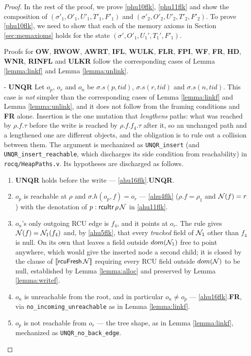 \begin{proof}
In the rest of the proof, we prove \ref{phu10flk}, \ref{phu11flk} and show the composition of $(\sigma'_1, O'_1, U'_1,T'_1,F'_1)$ and  $(\sigma'_2, O'_2, U'_2,T'_2,F'_2)$. To prove \ref{phu10flk}, we need to show that each of the memory axioms in Section \ref{sec:memaxioms} holds for the state $(\sigma',O'_1,U_1',T_1',F'_1)$.

Proofs for \textbf{OW}, \textbf{RWOW}, \textbf{AWRT}, \textbf{IFL}, \textbf{WULK}, \textbf{FLR}, \textbf{FPI}, \textbf{WF}, \textbf{FR}, \textbf{HD}, \textbf{WNR}, \textbf{RINFL} and \textbf{ULKR} follow the corresponding cases of Lemma \ref{lemma:linkf} and Lemma \ref{lemma:unlink}.

\begin{case} - \textbf{UNQR}
Let $o_p$, $o_r$ and $o_n$ be $\sigma.s(p,tid)$, $\sigma.s(r,tid)$ and
$\sigma.s(n,tid)$.  This case is \emph{not} simpler than the corresponding cases
of Lemma \ref{lemma:linkf} and Lemma \ref{lemma:unlink}, and it does not follow
from the framing conditions and \textbf{FR} alone.  Insertion is the one mutation
that \emph{lengthens} paths: what was reached by $\rho.f.\tau$ before the write is
reached by $\rho.f.f_4.\tau$ after it, so an unchanged path and a lengthened one
are different objects, and the obligation is to rule out a collision between them.
The argument is mechanized as \texttt{UNQR\_insert} (and
\texttt{UNQR\_insert\_reachable}, which discharges its side condition from
reachability) in \texttt{rocq/HeapPaths.v}.  Its hypotheses are discharged as
follows.

\begin{enumerate}
\item \textbf{UNQR} holds before the write --- \ref{ahu16flk}.\textbf{UNQR}.
\item $o_p$ is reachable at $\rho$ and $\sigma.h(o_p,f) = o_r$ --- \ref{ahu4flk}
  ($\rho.f = \rho_1$ and $\mathcal{N}(f) = r$) with the denotation of
  $p:\textsf{rcuItr}\,\rho\,\mathcal{N}$ in \ref{ahu11flk}.
\item $o_n$'s only outgoing \textsf{RCU} edge is $f_4$, and it points at $o_r$.
  The rule gives $\mathcal{N}(f) = \mathcal{N}_1(f_4)$ and, by \ref{ahu5flk}, that every
  \emph{tracked} field of $\mathcal{N}_1$ other than $f_4$ is \textsf{null}.  On its own
  that leaves a field outside $dom(\mathcal{N}_1)$ free to point anywhere, which would give
  the inserted node a second child; it is closed by the clause of
  $\llbracket \textsf{rcuFresh}\,\mathcal{N} \rrbracket$ requiring every \textsf{RCU} field
  outside $dom(\mathcal{N})$ to be \textsf{null}, established by Lemma \ref{lemma:alloc}
  and preserved by Lemma \ref{lemma:writef}.
\item $o_n$ is unreachable from the root, and in particular $o_n \neq o_p$ ---
  \ref{ahu16flk}.\textbf{FR}, via \texttt{no\_incoming\_unreachable} as in
  Lemma \ref{lemma:linkf}.
\item $o_p$ is not reachable from $o_r$ --- the tree shape, as in
  Lemma \ref{lemma:linkf}, mechanized as \texttt{UNQR\_no\_back\_edge}.
\end{enumerate}


\end{case}
\end{proof}
